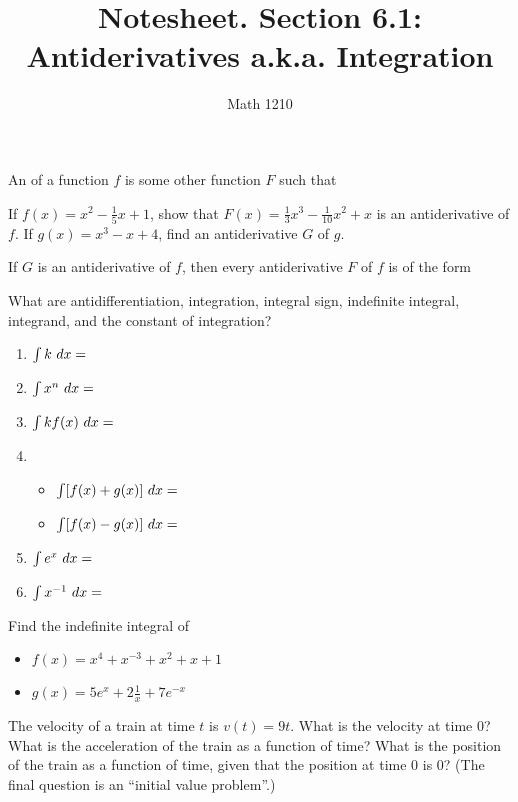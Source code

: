 \documentclass[12pt, a4paper]{article}
\author{Math 1210}
\title{Notesheet. Section 6.1: Antiderivatives a.k.a. Integration}
\date{}
\begin{document}
\maketitle
\nameline
\begin{defi}
  An  of a function $f$ is some other function $F$ such that
\end{defi}
\vspace{-0.65in}
\begin{ex}
  If $f(x) = x^2 - \frac{1}{5}x + 1$, show that $F(x) = \frac{1}{3}x^3 - \frac{1}{10}x^2 + x$ is an antiderivative of $f$.  If $g(x) = x^3 - x + 4$, find an antiderivative $G$ of $g$.
\end{ex}
\vspace{-0.8in}
\begin{thrm}
  If $G$ is an antiderivative of $f$, then every antiderivative $F$ of $f$ is of the form
\end{thrm}
\vspace{-0.65in}
\begin{defi}
  What are antidifferentiation, integration, integral sign, indefinite integral, integrand, and the constant of integration?
\end{defi}
\pagebreak
\begin{thrm}
  \mbox{}
  \begin{enumerate}[label=(\arabic*)]
    \item $\int k \ d x = $
    \item $\int x^n \ d x = $
    \item $\int k f(x) \ d x = $
    \item \begin{itemize}
      \item $\int [f(x) + g(x)] \ d x = $
      \item $\int [f(x) - g(x)] \ d x = $
    \end{itemize}
    \item $\int e^x \ d x = $
    \item $\int x^{-1} \ d x = $
  \end{enumerate}
\end{thrm}
\vspace{-1.0in}
\begin{ex}
  Find the indefinite integral of
  \begin{itemize}
    \item $f(x) = x^4 + x^{-3} + x^2 + x + 1$
    \item $g(x) = 5 e^x + 2 \frac{1}{x} + 7 e^{-x}$
  \end{itemize}
\end{ex}
\vspace{-1.5in}
\begin{ex}
  The velocity of a train at time $t$ is $v(t) = 9t$.  What is the velocity at time 0?  What is the acceleration of the train as a function of time?  What is the position of the train as a function of time, given that the position at time 0 is 0?  (The final question is an ``initial value problem''.)
\end{ex}
\end{document}
